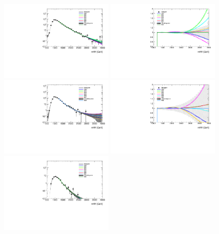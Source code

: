 \begin{figure}[htbp!]
\begin{center}
\includegraphics[width=0.48\textwidth,angle=-90]{figures/boosted/Syst_Smooth/smoothFuncCompare_22_comp.pdf}
\includegraphics[width=0.48\textwidth,angle=-90]{figures/boosted/Syst_Smooth/smoothFuncCompare_22_comp_ratio.pdf} \\
\includegraphics[width=0.48\textwidth,angle=-90]{figures/boosted/Syst_Smooth/smoothFuncCompare_33_comp.pdf}
\includegraphics[width=0.48\textwidth,angle=-90]{figures/boosted/Syst_Smooth/smoothFuncCompare_33_comp_ratio.pdf} \\
\includegraphics[width=0.48\textwidth,angle=-90]{figures/boosted/Syst_Smooth/smoothFuncCompare_44_comp.pdf}

\end{center}
\end{figure}
